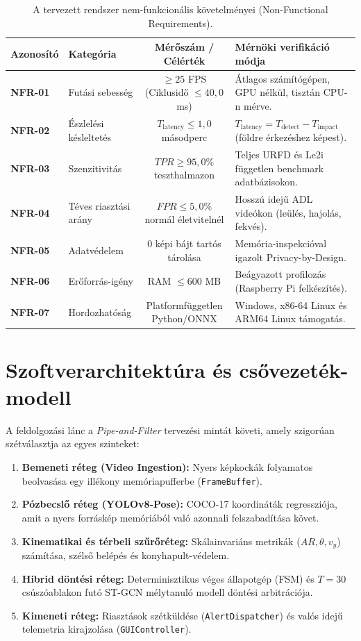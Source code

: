 \documentclass[12pt,a4paper,oneside]{report}
\begin{document}
\begin{table}[H]
\centering
\small
\begin{tabularx}{\textwidth}{llcX}
\toprule
\textbf{Azonosító} & \textbf{Kategória} & \textbf{Mérőszám / Célérték} & \textbf{Mérnöki verifikáció módja} \\
\midrule
\textbf{NFR-01} & Futási sebesség & $\ge 25$ FPS (Ciklusidő $\le 40{,}0$ ms) & Átlagos számítógépen, GPU nélkül, tisztán CPU-n mérve. \\
\textbf{NFR-02} & Észlelési késleltetés & $T_{\text{latency}} \le 1{,}0$ másodperc & $T_{\text{latency}} = T_{\text{detect}} - T_{\text{impact}}$ (földre érkezéshez képest). \\
\textbf{NFR-03} & Szenzitivitás & $TPR \ge 95{,}0\%$ teszthalmazon & Teljes URFD és Le2i független benchmark adatbázisokon. \\
\textbf{NFR-04} & Téves riasztási arány & $FPR \le 5{,}0\%$ normál életvitelnél & Hosszú idejű ADL videókon (leülés, hajolás, fekvés). \\
\textbf{NFR-05} & Adatvédelem & $0$ képi bájt tartós tárolása & Memória-inspekcióval igazolt Privacy-by-Design. \\
\textbf{NFR-06} & Erőforrás-igény & RAM $\le 600$ MB & Beágyazott profilozás (Raspberry Pi felkészítés). \\
\textbf{NFR-07} & Hordozhatóság & Platformfüggetlen Python/ONNX & Windows, x86-64 Linux és ARM64 Linux támogatás. \\
\bottomrule
\end{tabularx}
\caption{A tervezett rendszer nem-funkcionális követelményei (Non-Functional Requirements).}
\label{tab:non_functional_reqs}
\end{table}

\section{Szoftverarchitektúra és csővezeték-modell}
A feldolgozási lánc a \textit{Pipe-and-Filter} tervezési mintát követi, amely szigorúan szétválasztja az egyes szinteket:
\begin{enumerate}
    \item \textbf{Bemeneti réteg (Video Ingestion):} Nyers képkockák folyamatos beolvasása egy illékony memóriapufferbe (\texttt{FrameBuffer}).
    \item \textbf{Pózbecslő réteg (YOLOv8-Pose):} COCO-17 koordináták regressziója, amit a nyers forráskép memóriából való azonnali felszabadítása követ.
    \item \textbf{Kinematikai és térbeli szűrőréteg:} Skálainvariáns metrikák ($AR, \theta, v_y$) számítása, szélső belépés és konyhapult-védelem.
    \item \textbf{Hibrid döntési réteg:} Determinisztikus véges állapotgép (FSM) és $T=30$ csúszóablakon futó ST-GCN mélytanuló modell döntési arbitrációja.
    \item \textbf{Kimeneti réteg:} Riasztások szétküldése (\texttt{AlertDispatcher}) és valós idejű telemetria kirajzolása (\texttt{GUIController}).
\end{enumerate}
\end{document}
